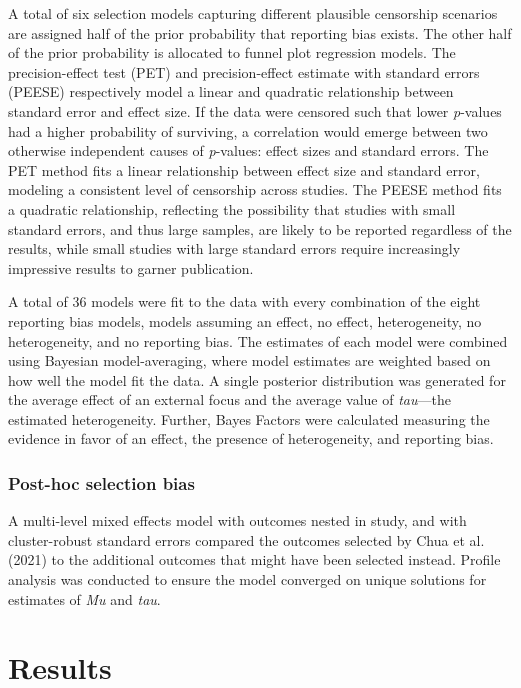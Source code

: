 \documentclass[
  man, donotrepeattitle,floatsintext]{apa7}
\begin{document}
A total of six selection models capturing different plausible censorship scenarios are assigned half of the prior probability that reporting bias exists. The other half of the prior probability is allocated to funnel plot regression models. The precision-effect test (PET) and precision-effect estimate with standard errors (PEESE) respectively model a linear and quadratic relationship between standard error and effect size. If the data were censored such that lower \emph{p}-values had a higher probability of surviving, a correlation would emerge between two otherwise independent causes of \emph{p}-values: effect sizes and standard errors. The PET method fits a linear relationship between effect size and standard error, modeling a consistent level of censorship across studies. The PEESE method fits a quadratic relationship, reflecting the possibility that studies with small standard errors, and thus large samples, are likely to be reported regardless of the results, while small studies with large standard errors require increasingly impressive results to garner publication.

A total of 36 models were fit to the data with every combination of the eight reporting bias models, models assuming an effect, no effect, heterogeneity, no heterogeneity, and no reporting bias. The estimates of each model were combined using Bayesian model-averaging, where model estimates are weighted based on how well the model fit the data. A single posterior distribution was generated for the average effect of an external focus and the average value of \emph{tau}---the estimated heterogeneity. Further, Bayes Factors were calculated measuring the evidence in favor of an effect, the presence of heterogeneity, and reporting bias.

\hypertarget{post-hoc-selection-bias}{%
\subsubsection{Post-hoc selection bias}\label{post-hoc-selection-bias}}

A multi-level mixed effects model with outcomes nested in study, and with cluster-robust standard errors compared the outcomes selected by Chua et al. (2021) to the additional outcomes that might have been selected instead. Profile analysis was conducted to ensure the model converged on unique solutions for estimates of \emph{Mu} and \emph{tau}.

\hypertarget{results}{%
\section{Results}\label{results}}
\end{document}
